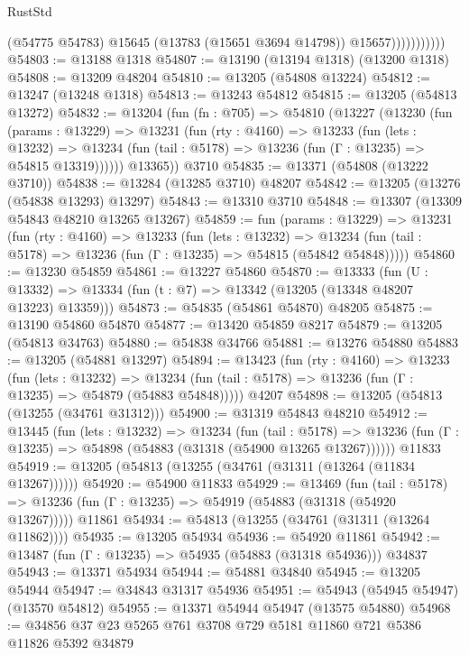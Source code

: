 \begin{lexlean}{RustStd}
\begin{coremodule}
                          (@54775 @54783)
                          @15645
                          (@13783 (@15651 @3694 @14798))
                          @15657)))))))))))
@54803 := @13188 @1318
@54807 := @13190 (@13194 @1318) (@13200 @1318)
@54808 := @13209 @48204
@54810 := @13205 (@54808 @13224)
@54812 := @13247 (@13248 @1318)
@54813 := @13243 @54812
@54815 := @13205 (@54813 @13272)
@54832 := @13204
    (fun (fn : @705) =>
    @54810
      (@13227
        (@13230
          (fun (params : @13229) =>
          @13231
            (fun (rty : @4160) =>
            @13233
              (fun (lets : @13232) =>
              @13234 (fun (tail : @5178) => @13236 (fun (Γ : @13235) => @54815 @13319))))))
        @13365))
    @3710
@54835 := @13371 (@54808 (@13222 @3710))
@54838 := @13284 (@13285 @3710) @48207
@54842 := @13205 (@13276 (@54838 @13293) @13297)
@54843 := @13310 @3710
@54848 := @13307 (@13309 @54843 @48210 @13265 @13267)
@54859 := fun (params : @13229) =>
  @13231
    (fun (rty : @4160) =>
    @13233
      (fun (lets : @13232) =>
      @13234 (fun (tail : @5178) => @13236 (fun (Γ : @13235) => @54815 (@54842 @54848)))))
@54860 := @13230 @54859
@54861 := @13227 @54860
@54870 := @13333
    (fun (U : @13332) => @13334 (fun (t : @7) => @13342 (@13205 (@13348 @48207 @13223) @13359)))
@54873 := @54835 (@54861 @54870) @48205
@54875 := @13190 @54860 @54870
@54877 := @13420 @54859 @8217
@54879 := @13205 (@54813 @34763)
@54880 := @54838 @34766
@54881 := @13276 @54880
@54883 := @13205 (@54881 @13297)
@54894 := @13423
    (fun (rty : @4160) =>
    @13233
      (fun (lets : @13232) =>
      @13234 (fun (tail : @5178) => @13236 (fun (Γ : @13235) => @54879 (@54883 @54848)))))
    @4207
@54898 := @13205 (@54813 (@13255 (@34761 @31312)))
@54900 := @31319 @54843 @48210
@54912 := @13445
    (fun (lets : @13232) =>
    @13234
      (fun (tail : @5178) =>
      @13236 (fun (Γ : @13235) => @54898 (@54883 (@31318 (@54900 @13265 @13267))))))
    @11833
@54919 := @13205 (@54813 (@13255 (@34761 (@31311 (@13264 (@11834 @13267))))))
@54920 := @54900 @11833
@54929 := @13469
    (fun (tail : @5178) => @13236 (fun (Γ : @13235) => @54919 (@54883 (@31318 (@54920 @13267)))))
    @11861
@54934 := @54813 (@13255 (@34761 (@31311 (@13264 @11862))))
@54935 := @13205 @54934
@54936 := @54920 @11861
@54942 := @13487 (fun (Γ : @13235) => @54935 (@54883 (@31318 @54936))) @34837
@54943 := @13371 @54934
@54944 := @54881 @34840
@54945 := @13205 @54944
@54947 := @34843 @31317 @54936
@54951 := @54943 (@54945 @54947) (@13570 @54812)
@54955 := @13371 @54944 @54947 (@13575 @54880)
@54968 := @34856 @37 @23 @5265 @761 @3708 @729 @5181 @11860 @721 @5386 @11826 @5392 @34879

\end{coremodule}
\end{lexlean}
